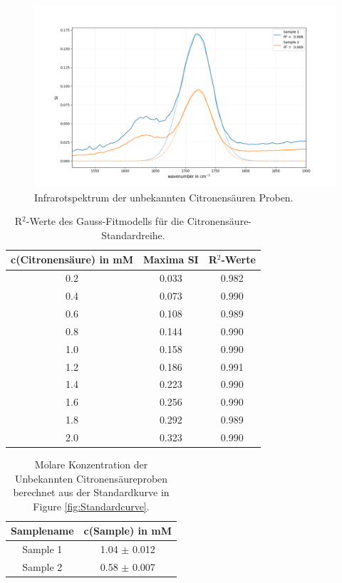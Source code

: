 \documentclass[10pt,a4paper]{article}
\begin{document}
		\begin{figure}[H]
			\centering
			\includegraphics[scale=0.55]{unknown_sample_fit.png}
			\caption{Infrarotspektrum der unbekannten Citronensäuren Proben.}
			\label{fig:IR_unknown}
		\end{figure}


			\begin{table}[H]
			\centering
			\caption{R$^2$-Werte des Gauss-Fitmodells für die Citronensäure-Standardreihe.}
			\label{tab:r_square_standardcurve}
			\begin{tabular}{ccc}
				\toprule
				c(Citronensäure) in mM & Maxima SI &R$^2$-Werte\\
				\midrule
				0.2	&0.033&0.982\\
				0.4	&0.073&0.990\\
				0.6	&0.108&0.989\\
				0.8	&0.144&0.990\\
				1.0	&0.158&0.990\\
				1.2	&0.186&0.991\\
				1.4	&0.223&0.990\\
				1.6	&0.256&0.990\\
				1.8	&0.292&0.989\\
				2.0	&0.323&0.990\\
				\bottomrule
			\end{tabular}
		\end{table}	
		
	
		\begin{table}[H]
			\centering
			\caption{Molare Konzentration der Unbekannten Citronensäureproben berechnet aus der Standardkurve in Figure \ref{fig:Standardcurve}.}
			\label{tab:sampleconc}
			\begin{tabular}{cc}
				\toprule
				Samplename & c(Sample) in mM\\
				\midrule
				Sample 1 & 1.04 $\pm$ 0.012\\
				Sample 2 & 0.58 $\pm$ 0.007\\
				\bottomrule
			\end{tabular}
		\end{table}	
\end{document}
